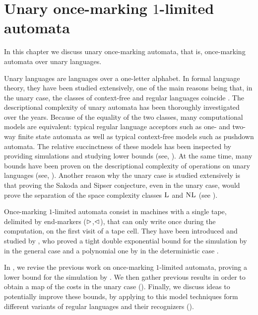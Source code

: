 \chapter{Unary once-marking \texorpdfstring{$1$}{1}-limited automata}
In this chapter we discuss unary once-marking automata, that is, once-marking automata over unary languages.

Unary languages are languages over a one-letter alphabet.
In formal language theory, they have been studied extensively, one of the main reasons being that, in the unary case, the classes of context-free and regular languages coincide \cite{GinRic62}.
The descriptional complexity of unary automata has been thoroughly investigated over the years.
Because of the equality of the two classes, many computational models are equivalent: typical regular language acceptors such as one- and two-way finite state automata as well as typical context-free models such as pushdown automata.
The relative succinctness of these models has been inspected by providing simulations and studying lower bounds (see, \eg[,] \cite{GefMer+03,MerPig01,Pig08,PigSha+02}).
At the same time, many bounds have been proven on the descriptional complexity of operations on unary languages (see, \eg[,] \cite{HolKut03,KunOkh12,MerPig05,PigSha02}).
Another reason why the unary case is studied extensively is that proving the Sakoda and Sipser conjecture, even in the unary case, would prove the separation of the space complexity classes $\textsc{L}$ and $\textsc{NL}$ (see ).

Once-marking $1$-limited automata consist in machines with a single tape, delimited by end-markers ($\rhd$,$\lhd$), that can only write once during the computation, on the first visit of a tape cell.
They have been introduced and studied by \citeauthor{PigPri23a}, who proved a tight double exponential bound for the simulation by \ODFAs in the general case and a polynomial one by \TDFA in the deterministic case \cite{PigPri23a}.

In , we revise the previous work on once-marking $1$-limited automata, proving a lower bound for the simulation by \ONFA.
We then gather previous results in order to obtain a map of the costs in the unary case ().
Finally, we discuss ideas to potentially improve these bounds, by applying to this model techniques form different variants of regular languages and their recognizers ().



